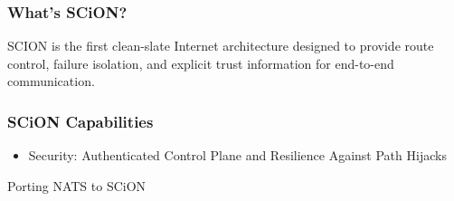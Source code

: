 \documentclass[aspectratio=169]{beamer}
\begin{document}
\begin{frame}
  \frametitle{What's SCiON?}
  SCION is the first clean-slate Internet architecture designed to provide route control, failure isolation, and explicit trust information for end-to-end communication.
\end{frame}

\begin{frame}
\frametitle{SCiON Capabilities}
  \begin{itemize}[<alert@+>]
    \item Security: Authenticated Control Plane and Resilience Against Path Hijacks
    \note[item]{}
  \end{itemize}
\end{frame}

\begin{frame}[c]
  \begin{center}
    \Huge{Porting NATS to SCiON}
  \end{center}
\end{frame}
\end{document}
